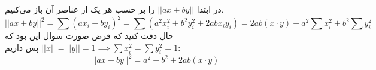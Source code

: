 \\\\
در ابتدا
$||ax + by||$
را بر حسب هر یک از عناصر آن باز می‌کنیم.
\begin{equation*}
    ||ax + by||^2 = \sum (ax_i + by_i)^2 = \sum (a^2 x_i^2 + b^2 y_i^2 + 2ab x_i y_i)
    = 2 ab (x \cdot y) + a^2 \sum x_i^2 + b^2 \sum y_i^2
\end{equation*}
حال دقت کنید که فرض صورت سوال این بود که
$||x|| = ||y|| = 1 \implies \sum x_i^2 = \sum y_i^2 = 1$
پس داریم:
\begin{equation*}
    ||ax + by||^2 = a^2 + b^2 + 2 ab (x \cdot y)
\end{equation*}